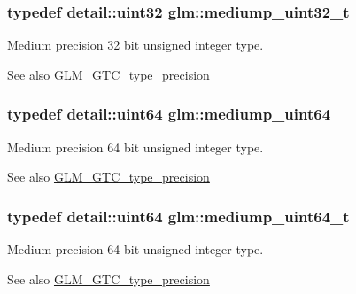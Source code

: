 \subsubsection[{\texorpdfstring{mediump\+\_\+uint32\+\_\+t}{mediump_uint32_t}}]{\setlength{\rightskip}{0pt plus 5cm}typedef detail\+::uint32 {\bf glm\+::mediump\+\_\+uint32\+\_\+t}}\hypertarget{group__gtc__type__precision_gac7782c1e393f9ad47e41a177a685f287}{}\label{group__gtc__type__precision_gac7782c1e393f9ad47e41a177a685f287}
Medium precision 32 bit unsigned integer type. \begin{DoxySeeAlso}{See also}
\hyperlink{group__gtc__type__precision}{G\+L\+M\+\_\+\+G\+T\+C\+\_\+type\+\_\+precision} 
\end{DoxySeeAlso}
\subsubsection[{\texorpdfstring{mediump\+\_\+uint64}{mediump_uint64}}]{\setlength{\rightskip}{0pt plus 5cm}typedef detail\+::uint64 {\bf glm\+::mediump\+\_\+uint64}}\hypertarget{group__gtc__type__precision_ga6685788d15d0a973ee7c2460d0456dc1}{}\label{group__gtc__type__precision_ga6685788d15d0a973ee7c2460d0456dc1}
Medium precision 64 bit unsigned integer type. \begin{DoxySeeAlso}{See also}
\hyperlink{group__gtc__type__precision}{G\+L\+M\+\_\+\+G\+T\+C\+\_\+type\+\_\+precision} 
\end{DoxySeeAlso}
\subsubsection[{\texorpdfstring{mediump\+\_\+uint64\+\_\+t}{mediump_uint64_t}}]{\setlength{\rightskip}{0pt plus 5cm}typedef detail\+::uint64 {\bf glm\+::mediump\+\_\+uint64\+\_\+t}}\hypertarget{group__gtc__type__precision_gaa97354d3120a6dc029a5e9563723de18}{}\label{group__gtc__type__precision_gaa97354d3120a6dc029a5e9563723de18}
Medium precision 64 bit unsigned integer type. \begin{DoxySeeAlso}{See also}
\hyperlink{group__gtc__type__precision}{G\+L\+M\+\_\+\+G\+T\+C\+\_\+type\+\_\+precision} 
\end{DoxySeeAlso}
